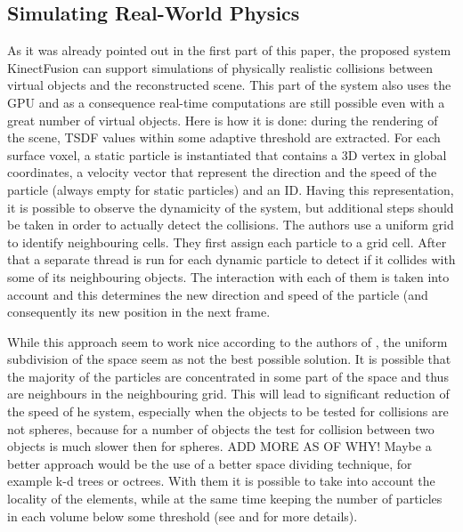 \documentclass[12pt]{article}
\theoremstyle{plain}
\begin{document}
  \subsection{Simulating Real-World Physics} %
  \label{sub:Simulating Real-World Physics}
    As it was already pointed out in the first part of this paper, the proposed
    system KinectFusion can support simulations of physically realistic
    collisions between virtual objects and the reconstructed scene. This part of
    the system also uses the GPU and as a consequence real-time computations are
    still possible even with a great number of virtual objects. Here is how it
    is done: during the rendering of the scene, TSDF values within some adaptive
    threshold are extracted. For each surface voxel, a static particle is
    instantiated that contains a 3D vertex in global coordinates, a velocity
    vector that represent the direction and the speed of the particle (always
    empty for static particles) and an ID. Having this representation, it is
    possible to observe the dynamicity of the system, but additional steps
    should be taken in order to actually detect the collisions. The authors use
    a uniform grid to identify neighbouring cells. They first assign each
    particle to a grid cell. After that a separate thread is run for each
    dynamic particle to detect if it collides with some of its neighbouring
    objects. The interaction with each of them is taken into account and this
    determines the new direction and speed of the particle (and consequently its
    new position in the next frame. 

    While this approach seem to work nice according to the authors of
    \cite{kinectfusion}, the uniform subdivision of the space seem as not the
    best possible solution. It is possible that the majority of the particles
    are concentrated in some part of the space and thus are neighbours in the
    neighbouring grid. This will lead to significant reduction of the speed of
    he system, especially when the objects to be tested for collisions are not
    spheres, because for a number of objects the test for collision between two
    objects is much slower then for spheres. ADD MORE AS OF WHY! Maybe a better approach would be the use of a better space
    dividing technique, for example k-d trees or octrees. With them it is
    possible to take into account the locality of the elements, while at the
    same time keeping the number of particles in each volume below some
    threshold (see \cite{fast-collision-detection} and
    \cite{collision-detection-based-on-partitioning} for more details).
\end{document}
